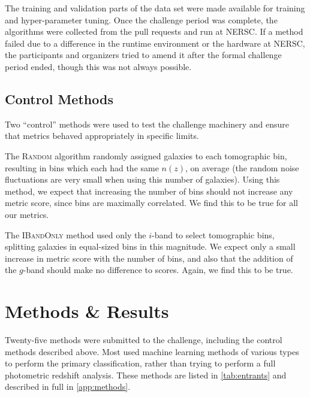 \documentclass[twocolumn,twocolappendix]{aastex63}
\begin{document}
The training and validation parts of the data set were made available for training
and hyper-parameter tuning. Once the challenge period was complete, the algorithms
were collected from the pull requests and run at NERSC. If a method failed due to a difference in the
runtime environment or the hardware at NERSC, the participants and organizers tried
to amend it after the formal challenge period ended, though this was not always possible.



\subsection{Control Methods}

Two ``control'' methods were used to test the challenge machinery and ensure
that metrics behaved appropriately in specific limits.

The \textsc{Random} algorithm randomly assigned galaxies to each tomographic bin, resulting
in bins which each had the same $n(z)$, on average (the random noise fluctuations
are very small when using this number of galaxies).  Using this method, we expect
that increasing the number of bins should not increase any metric score, since bins are
maximally correlated.  We find this to be true for all our metrics.

The \textsc{IBandOnly} method used only the $i$-band to select tomographic bins,
splitting galaxies in equal-sized bins in this magnitude. We expect only a small
increase in metric score with the number of bins, and also that the addition of the $g$-band
should make no difference to scores.  Again, we find this to be true.



\section{Methods \& Results} \label{sec:results}


Twenty-five methods were submitted to the challenge, including the control methods described above.
Most used machine learning methods of various types to perform the primary classification,
rather than trying to perform a full photometric redshift analysis.  
These methods are listed in \autoref{tab:entrants} and described in full in \autoref{app:methods}.
\end{document}
